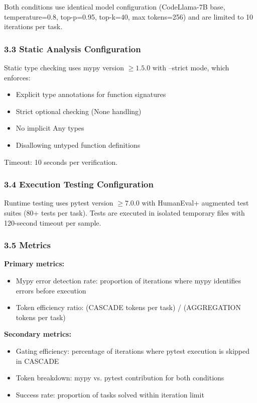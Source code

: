 Both conditions use identical model configuration (CodeLlama-7B base, temperature=0.8, top-p=0.95, top-k=40, max tokens=256) and are limited to 10 iterations per task.

\subsubsection{3.3 Static Analysis Configuration}

Static type checking uses mypy version $\geq 1.5.0$ with --strict mode, which enforces:
\begin{itemize}
\item Explicit type annotations for function signatures
\item Strict optional checking (None handling)
\item No implicit Any types
\item Disallowing untyped function definitions
\end{itemize}

Timeout: 10 seconds per verification.

\subsubsection{3.4 Execution Testing Configuration}

Runtime testing uses pytest version $\geq 7.0.0$ with HumanEval+ augmented test suites (80+ tests per task). Tests are executed in isolated temporary files with 120-second timeout per sample.

\subsubsection{3.5 Metrics}

\textbf{Primary metrics:}
\begin{itemize}
\item Mypy error detection rate: proportion of iterations where mypy identifies errors before execution
\item Token efficiency ratio: (CASCADE tokens per task) / (AGGREGATION tokens per task)
\end{itemize}

\textbf{Secondary metrics:}
\begin{itemize}
\item Gating efficiency: percentage of iterations where pytest execution is skipped in CASCADE
\item Token breakdown: mypy vs. pytest contribution for both conditions
\item Success rate: proportion of tasks solved within iteration limit
\end{itemize}

